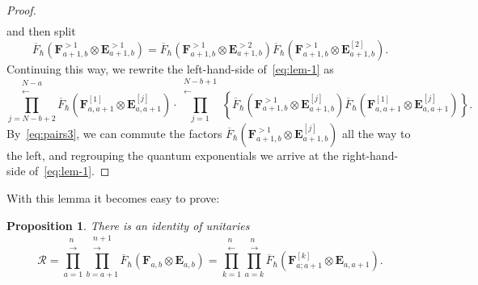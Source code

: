\documentclass[11pt, reqno]{amsart}
\newtheorem{prop}[theorem]{Proposition}
\theoremstyle{definition}
\numberwithin{equation}{section}
\def\beq{\begin{equation}}
\def\eeq{\end{equation}}
\newcommand{\hr}[1]{\left(#1\right)}                                                    %
\newcommand{\hc}[1]{\left\{#1\right\}}                                                  %
\def\Rc{\mathcal R}
\def\stgE{\mathbf{E}}
\def\stgF{\mathbf{F}}
\begin{document}
\begin{proof}
\begin{multline*}
\end{multline*}
and then split 
$$
\overline{F}_\hbar( \stgF^{>1}_{a+1,b}\otimes\stgE^{>1}_{a+1,b}) = \overline{F}_\hbar( \stgF^{>1}_{a+1,b}\otimes\stgE^{>2}_{a+1,b})\overline{F}_\hbar( \stgF^{>1}_{a+1,b}\otimes\stgE^{[2]}_{a+1,b}).
$$
Continuing this way, we rewrite the left-hand-side of~\eqref{eq:lem-1} as
$$
\prod_{j=N-b+2}^{\substack{N-a \\[-2pt] \longleftarrow}} \overline F_\hbar(\stgF^{[1]}_{a,a+1} \otimes \stgE^{[j]}_{a,a+1}) \cdot \prod\limits_{j=1}^{\substack{N-b+1 \\[-2pt] \longleftarrow}}\hc{\overline F_\hbar(\stgF^{>1}_{a+1,b} \otimes \stgE^{[j]}_{a+1,b})\overline F_\hbar(\stgF^{[1]}_{a,a+1} \otimes \stgE^{[j]}_{a,a+1})}.
$$
By~\eqref{eq:pairs3}, we can commute the factors $\overline F_\hbar(\stgF^{>1}_{a+1,b} \otimes \stgE^{[j]}_{a+1,b})$ all the way to the left, and regrouping the quantum exponentials we arrive at the right-hand-side of~\eqref{eq:lem-1}.
\end{proof}


With this lemma it becomes easy to prove:
\begin{prop}
\label{prop:R-factor}
There is an identity of unitaries
\beq
\label{eq:R-fin}
\Rc = \prod_{a=1}^{\substack{n \\[-2pt] \longrightarrow}} \prod_{b=a+1}^{\substack{n+1 \\[-2pt] \longrightarrow}} \overline{F}_\hbar(\stgF_{a,b} \otimes \stgE_{a,b})=\prod_{k=1}^{\substack{n \\[-2pt] \longleftarrow}} \prod_{a=k}^{\substack{n \\[-2pt] \longrightarrow}} \overline F_\hbar\hr{\stgF_{a;a+1}^{[k]} \otimes \stgE_{a,a+1}}.
\eeq
\end{prop}
\end{document}

